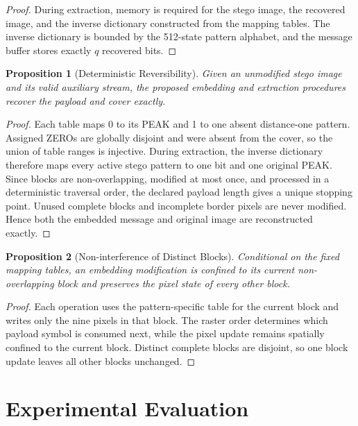 \documentclass[a4paper,fleqn]{cas-dc}
\newtheorem{proposition}{Proposition}[section]
\begin{document}
\begin{proof}
During extraction, memory is required for the stego image, the recovered image,
and the inverse dictionary constructed from the mapping tables.
The inverse dictionary is bounded by the 512-state pattern alphabet, and the
message buffer stores exactly $q$ recovered bits.
\end{proof}

\begin{proposition}[Deterministic Reversibility]
Given an unmodified stego image and its valid auxiliary stream, the proposed
embedding and extraction procedures recover the payload and cover exactly.
\end{proposition}

\begin{proof}
Each table maps 0 to its PEAK and 1 to one absent distance-one pattern.
Assigned ZEROs are globally disjoint and were absent from the cover, so the
union of table ranges is injective. During extraction, the inverse dictionary
therefore maps every active stego pattern to one bit and one original PEAK.
Since blocks are non-overlapping, modified at most once, and processed in a
deterministic traversal order, the declared payload length gives a unique
stopping point. Unused complete blocks and incomplete border pixels are never
modified. Hence both the embedded message and original image are reconstructed
exactly.
\end{proof}

\begin{proposition}[Non-interference of Distinct Blocks]
Conditional on the fixed mapping tables, an embedding modification is confined
to its current non-overlapping block and preserves the pixel state of every
other block.
\end{proposition}

\begin{proof}
Each operation uses the pattern-specific table for the current block and writes
only the nine pixels in that block. The raster order determines which payload
symbol is consumed next, while the pixel update remains spatially confined to
the current block. Distinct complete blocks are disjoint, so one block update
leaves all other blocks unchanged.
\end{proof}


\section{Experimental Evaluation}
\label{sec:experimental}
\end{document}
